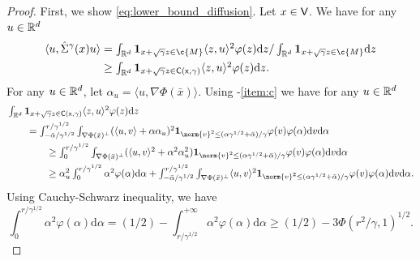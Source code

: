 \begin{proof}
	First, we show \eqref{eq:lower_bound_diffusion}.
	Let $x \in \sf{V}$.
	We have for any $u \in \mathbb{R}^d$ \begin{align} \label{eq:first-lower} \langle u, \hat{\Sigma}^\gamma(x) u \rangle & = \textstyle{\int_{\R^d} \bm{1}_{x +\sqrt{\gamma}z \in \c{M}} \langle z, u\rangle^2 \varphi(z) \mathrm{d} z / \int_{\R^d} \bm{1}_{x +\sqrt{\gamma}z \in \c{M}} \mathrm{d} z } \\ &\geq \textstyle{\int_{\R^d} \bm{1}_{x+\sqrt{\gamma} z \in \sf{C}(x,\gamma)} \langle z, u\rangle^2 \varphi(z) \mathrm{d} z} .
	\end{align}
	For any $u \in \mathbb{R}^d$, let $\alpha_u = \langle u, \nabla \Phi(\bar{x}) \rangle$.
	Using -\ref{item:c} we have for any $u \in \mathbb{R}^d$ \begin{align}  & \textstyle \int_{\R^d} \bm{1}_{x+\sqrt{\gamma} z \in \sf{C}(x,\gamma)} \langle z, u\rangle^2 \varphi(z) \mathrm{d} z \\ &\qquad \textstyle = \int_{-\bar{\alpha}/\gamma^{1/2}}^{r/\gamma^{1/2}} \int_{\nabla \Phi(\bar{x})^\perp} (\langle u, v \rangle + \alpha \alpha_u)^2 \bm{1}_{\norm{v}^2 \leq (\alpha \gamma^{1/2} + \bar{\alpha})/\gamma} \varphi(v) \varphi(\alpha) \mathrm{d} v \mathrm{d} \alpha \\ &\qquad \qquad \textstyle \geq \int_{0}^{r/\gamma^{1/2}} \int_{\nabla \Phi(\bar{x})^\perp} (\langle u, v \rangle^2 + \alpha^2 \alpha_u^2) \bm{1}_{\norm{v}^2 \leq (\alpha \gamma^{1/2} + \bar{\alpha})/\gamma} \varphi(v) \varphi(\alpha) \mathrm{d} v \mathrm{d} \alpha \\  & \qquad \qquad\textstyle \geq \alpha_u^2 \int_0^{r/\gamma^{1/2}} \alpha^2 \varphi(\alpha) \mathrm{d} \alpha + \int_{-\bar{\alpha}/\gamma^{1/2}}^{r/\gamma^{1/2}} \int_{\nabla \Phi(\bar{x})^\perp} \langle u, v \rangle^2 \bm{1}_{\norm{v}^2 \leq (\alpha \gamma^{1/2} + \bar{\alpha})/\gamma} \varphi(v) \varphi(\alpha) \mathrm{d} v \mathrm{d} \alpha .
                 \label{eq:lower_bound_decomp}
	\end{align}
	Using Cauchy-Schwarz inequality, we have \begin{equation} \label{eq:lower_bound_easy} \textstyle\int_0^{r/\gamma^{1/2}} \alpha^2 \varphi(\alpha) \mathrm{d} \alpha = (1/2) - \int_{r/\gamma^{1/2}}^{+\infty} \alpha^2 \varphi(\alpha) \mathrm{d} \alpha \geq (1/2) - 3 \Phi(r^2/\gamma,1)^{1/2}.
	\end{equation}

\end{proof}
